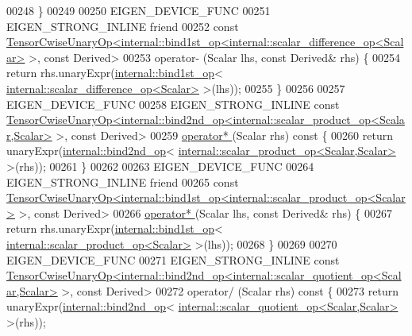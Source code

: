 \begin{DoxyCode}
00248     \}
00249 
00250     EIGEN\_DEVICE\_FUNC
00251     EIGEN\_STRONG\_INLINE \textcolor{keyword}{friend}
00252     \textcolor{keyword}{const} 
      \hyperlink{class_eigen_1_1_tensor_cwise_unary_op}{TensorCwiseUnaryOp<internal::bind1st\_op<internal::scalar\_difference\_op<Scalar>}
       >, \textcolor{keyword}{const} Derived>
00253     operator- (Scalar lhs, \textcolor{keyword}{const} Derived& rhs) \{
00254       \textcolor{keywordflow}{return} rhs.unaryExpr(\hyperlink{struct_eigen_1_1internal_1_1bind1st__op}{internal::bind1st\_op}<
      \hyperlink{struct_eigen_1_1internal_1_1scalar__difference__op}{internal::scalar\_difference\_op<Scalar>} >(lhs));
00255     \}
00256 
00257     EIGEN\_DEVICE\_FUNC
00258     EIGEN\_STRONG\_INLINE \textcolor{keyword}{const} 
      \hyperlink{class_eigen_1_1_tensor_cwise_unary_op}{TensorCwiseUnaryOp<internal::bind2nd\_op<internal::scalar\_product\_op<Scalar,Scalar>}
       >, \textcolor{keyword}{const} Derived>
00259     \hyperlink{namespace_eigen_a32970f7eb62fe31eeefee72d24a046d0}{operator* }(Scalar rhs)\textcolor{keyword}{ const }\{
00260       \textcolor{keywordflow}{return} unaryExpr(\hyperlink{struct_eigen_1_1internal_1_1bind2nd__op}{internal::bind2nd\_op}<
      \hyperlink{struct_eigen_1_1internal_1_1scalar__product__op}{internal::scalar\_product\_op<Scalar,Scalar>} >(rhs));
00261     \}
00262 
00263     EIGEN\_DEVICE\_FUNC
00264     EIGEN\_STRONG\_INLINE \textcolor{keyword}{friend}
00265     \textcolor{keyword}{const} 
      \hyperlink{class_eigen_1_1_tensor_cwise_unary_op}{TensorCwiseUnaryOp<internal::bind1st\_op<internal::scalar\_product\_op<Scalar>}
       >, \textcolor{keyword}{const} Derived>
00266     \hyperlink{namespace_eigen_a32970f7eb62fe31eeefee72d24a046d0}{operator* }(Scalar lhs, \textcolor{keyword}{const} Derived& rhs) \{
00267       \textcolor{keywordflow}{return} rhs.unaryExpr(\hyperlink{struct_eigen_1_1internal_1_1bind1st__op}{internal::bind1st\_op}<
      \hyperlink{struct_eigen_1_1internal_1_1scalar__product__op}{internal::scalar\_product\_op<Scalar>} >(lhs));
00268     \}
00269 
00270     EIGEN\_DEVICE\_FUNC
00271     EIGEN\_STRONG\_INLINE \textcolor{keyword}{const} 
      \hyperlink{class_eigen_1_1_tensor_cwise_unary_op}{TensorCwiseUnaryOp<internal::bind2nd\_op<internal::scalar\_quotient\_op<Scalar,Scalar>}
       >, \textcolor{keyword}{const} Derived>
00272     operator/ (Scalar rhs)\textcolor{keyword}{ const }\{
00273       \textcolor{keywordflow}{return} unaryExpr(\hyperlink{struct_eigen_1_1internal_1_1bind2nd__op}{internal::bind2nd\_op}<
      \hyperlink{struct_eigen_1_1internal_1_1scalar__quotient__op}{internal::scalar\_quotient\_op<Scalar,Scalar>} >(rhs));

\end{DoxyCode}
